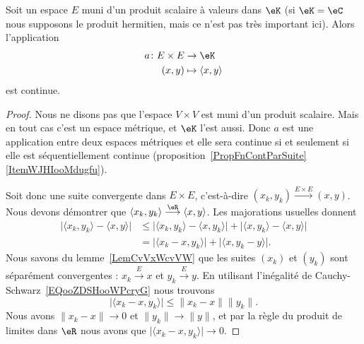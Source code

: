 \begin{proposition}          \label{PROPooKDGOooDjWQct}
    Soit un espace \( E\) muni d'un produit scalaire à valeurs dans \( \eK\) (si \( \eK=\eC\) nous supposons le produit hermitien, mais ce n'est pas très important ici). Alors l'application
    \begin{equation}
        \begin{aligned}
            a\colon E\times E & \to \eK \\
                    (x,y)     & \mapsto \langle x, y\rangle
        \end{aligned}
    \end{equation}
    est continue.
\end{proposition}

\begin{proof}
    Nous ne disons pas que l'espace \( V\times V\) est muni d'un produit scalaire. Mais en tout cas c'est un espace métrique, et \( \eK\) l'est aussi. Donc \( a\) est une application entre deux espaces métriques et elle sera continue si et seulement si elle est séquentiellement continue (proposition~\ref{PropFnContParSuite}\ref{ItemWJHIooMdugfu}).

    Soit donc une suite convergente dans \( E\times E\), c'est-à-dire \( (x_k,y_k)\stackrel{E\times E}{\longrightarrow}(x,y)\). Nous devons démontrer que \( \langle x_k, y_k\rangle \stackrel{\eR}{\longrightarrow}\langle x, y\rangle \). Les majorations usuelles donnent
    \begin{subequations}
        \begin{align}
            \big| \langle x_k, y_k\rangle -\langle x, y\rangle  \big|&\leq \big| \langle x_k, y_k\rangle -\langle x, y_k\rangle  \big|+\big| \langle x, y_k\rangle -\langle x, y\rangle  \big|\\
            &=\big| \langle x_k-x, y_k\rangle  \big|+\big| \langle x, y_k-y\rangle  \big|.
        \end{align}
    \end{subequations}
    Nous savons du lemme~\ref{LemCvVxWcvVW} que les suites \( (x_k)\) et \( (y_k)\) sont séparément convergentes : \( x_k\stackrel{E}{\longrightarrow}x\) et \( y_k\stackrel{E}{\longrightarrow}y\). En utilisant l'inégalité de Cauchy-Schwarz~\ref{EQooZDSHooWPcryG} nous trouvons
    \begin{equation}
        \big| \langle x_k-x, y_k\rangle  \big|\leq \| x_k-x \|\| y_k \|.
    \end{equation}
    Nous avons \( \| x_k-x \|\to 0\) et \( \| y_k \|\to \| y \|\), et par la règle du produit de limites dans \( \eR\) nous avons que \( \big| \langle x_k-x, y_k\rangle  \big|\to 0\).
\end{proof}

